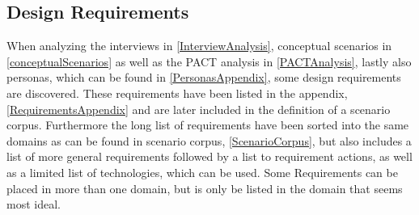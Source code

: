 \subsection{Design Requirements} \label{DesignRequirements}
When analyzing the interviews in \cref{InterviewAnalysis}, conceptual scenarios in \cref{conceptualScenarios} as well as the PACT analysis in \cref{PACTAnalysis}, lastly also personas, which can be found in \cref{PersonasAppendix}, some design requirements are discovered. These requirements have been listed in the appendix, \cref{RequirementsAppendix} and are later included in the definition of a scenario corpus. Furthermore the long list of requirements have been sorted into the same domains as can be found in scenario corpus, \cref{ScenarioCorpus}, but also includes a list of more general requirements followed by a list to requirement actions, as well as a limited list of technologies, which can be used. Some Requirements can be placed in more than one domain, but is only be listed in the domain that seems most ideal.